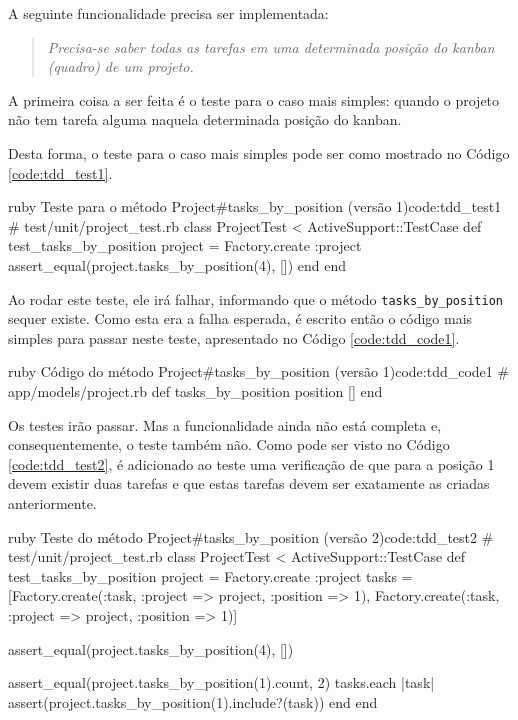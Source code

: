 A seguinte funcionalidade precisa ser implementada:

\begin{quote}
\textit{Precisa-se saber todas as tarefas em uma determinada posição do kanban (quadro) de um projeto.}
\end{quote}

A primeira coisa a ser feita é o teste para o caso mais simples: quando o projeto não tem tarefa alguma naquela determinada posição do kanban.

Desta forma, o teste para o caso mais simples pode ser como mostrado no Código \ref{code:tdd_test1}.

\begin{mycode}{ruby}%
{Teste para o método Project\#tasks\_by\_position (versão 1)}{code:tdd_test1}
# test/unit/project_test.rb
class ProjectTest < ActiveSupport::TestCase
  def test_tasks_by_position
    project = Factory.create :project
    assert_equal(project.tasks_by_position(4), [])
  end
end
\end{mycode}

Ao rodar este teste, ele irá falhar, informando que o método \texttt{tasks\_by\_position} sequer existe. Como esta era a falha esperada, é escrito então o código mais simples para passar neste teste, apresentado no Código \ref{code:tdd_code1}.

\begin{mycode}{ruby}%
{Código do método Project\#tasks\_by\_position (versão 1)}{code:tdd_code1}
# app/models/project.rb
def tasks_by_position position
  []
end
\end{mycode}

Os testes irão passar. Mas a funcionalidade ainda não está completa e, consequentemente, o teste também não. Como pode ser visto no Código \ref{code:tdd_test2}, é adicionado ao teste uma verificação de que para a posição 1 devem existir duas tarefas e que estas tarefas devem ser exatamente as criadas anteriormente.

\begin{mycode}{ruby}%
{Teste do método Project\#tasks\_by\_position (versão 2)}{code:tdd_test2}
# test/unit/project_test.rb
class ProjectTest < ActiveSupport::TestCase
  def test_tasks_by_position
    project = Factory.create :project
    tasks = [Factory.create(:task, :project => project, :position => 1),
             Factory.create(:task, :project => project, :position => 1)]

    assert_equal(project.tasks_by_position(4), [])

    assert_equal(project.tasks_by_position(1).count, 2)
    tasks.each { |task| assert(project.tasks_by_position(1).include?(task)) }
  end
end
\end{mycode}


